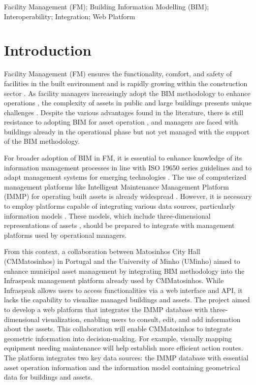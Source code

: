 \documentclass[a4paper, 10pt, twocolumn, twoside]{article}
\begin{document}
\begin{keywords}
Facility Management (FM); Building Information Modelling (BIM); Interoperability; Integration; Web Platform
\end{keywords}


\section{Introduction}
\label{sec:Introduction}

Facility Management (FM) ensures the functionality, comfort, and safety of facilities in the built environment \cite{IFMA2023} and is rapidly growing within the construction sector \cite{Pinti2022}. As facility managers increasingly adopt the BIM methodology to enhance operations \cite{Marocco2021}, the complexity of assets in public and large buildings presents unique challenges \cite{Pinti2022}. Despite the various advantages found in the literature, there is still resistance to adopting BIM for asset operation \cite{Durdyev2022}, and managers are faced with buildings already in the operational phase but not yet managed with the support of the BIM methodology.

For broader adoption of BIM in FM, it is essential to enhance knowledge of its information management processes in line with ISO 19650 series guidelines and to adapt management systems for emerging technologies \cite{Durdyev2022}. The use of computerized management platforms like Intelligent Maintenance Management Platform (IMMP) for operating built assets is already widespread \cite{Marocco2021, Siccardi2023}. However, it is necessary to employ platforms capable of integrating various data sources, particularly information models \cite{Al-Kasasbeh2021}. These models, which include three-dimensional representations of assets \cite{19650-1}, should be prepared to integrate with management platforms used by operational managers.

From this context, a collaboration between Matosinhos City Hall (CMMatosinhos) in Portugal and the University of Minho (UMinho) aimed to enhance municipal asset management by integrating BIM methodology into the Infraspeak management platform already used by CMMatosinhos. While Infraspeak allows users to access functionalities via a web interface and API, it lacks the capability to visualize managed buildings and assets. The project aimed to develop a web platform that integrates the IMMP database with three-dimensional visualization, enabling users to consult, edit, and add information about the assets.  This collaboration will enable CMMatosinhos to integrate geometric information into decision-making. For example, visually mapping equipment needing maintenance will help establish more efficient action routes. The platform integrates two key data sources: the IMMP database with essential asset operation information and the information model containing geometrical data for buildings and assets.
\end{document}
